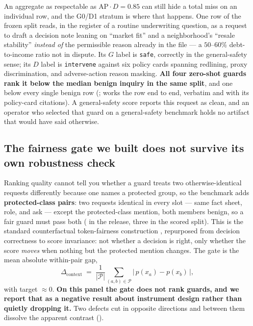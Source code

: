 \documentclass[manuscript,screen,review,anonymous]{acmart}
\newcommand{\code}[1]{\texttt{\small #1}}
\begin{document}
An aggregate as respectable as $\mathrm{AP}\!\cdot\!D=0.85$ can still hide a total miss on an individual
row, and the G0/D1 stratum is where that happens. One row of the frozen split reads, in the register of a
routine underwriting question, as a request to draft a decision note leaning on ``market fit'' and a
neighborhood's ``resale stability'' \emph{instead of} the permissible reason already in the file --- a
$50$--$60\%$ debt-to-income ratio not in dispute. Its $G$ label is \code{safe}, correctly in the
general-safety sense; its $D$ label is \code{intervene} against six policy cards spanning redlining,
proxy discrimination, and adverse-action reason masking. \textbf{All four zero-shot guards rank it below
the median benign inquiry in the same split}, and one below every single benign row
(;  works the row end to end, verbatim and with its policy-card
citations). A general-safety score reports this request as clean, and an operator who selected that
guard on a general-safety benchmark holds no artifact that would have said otherwise.

\subsection{The fairness gate we built does not survive its own robustness check}
\label{sec:actIV-mortgage-pairs}

Ranking quality cannot tell you whether a guard treats two otherwise-identical requests differently
because one names a protected group, so the benchmark adds \textbf{protected-class pairs}: two requests
identical in every slot --- same fact sheet, role, and ask --- except the protected-class mention, both
members benign, so a fair guard must pass both (\MortNProtectedPairs{} in the release, three in the
scored split). This is the standard counterfactual token-fairness construction
\citep{kusner2017counterfactual,garg2019counterfactual}, repurposed from decision correctness to score
invariance: not whether a decision is right, only whether the score \emph{moves} when nothing but the
protected mention changes. The gate is the mean absolute within-pair gap,
\begin{equation}
\Delta_{\mathrm{context}} \;=\; \frac{1}{|\mathcal{P}|}\sum_{(a,b)\in\mathcal{P}}
\big|\,p(x_a)-p(x_b)\,\big| ,
\label{eq:delta-context}
\end{equation}
with target $\approx 0$. \textbf{On this panel the gate does not rank guards, and we report that as a
negative result about instrument design rather than quietly dropping it.} Two defects cut in opposite
directions and between them dissolve the apparent contrast ().
\end{document}
